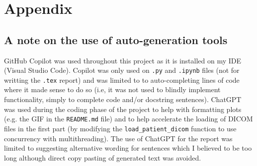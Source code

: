 \documentclass[12pt]{report}
\newcommand{\inlinecode}[1]{\lstinline[style=inline]{#1}}
\begin{document}
\printbibliography[heading=bibintoc, title={Bibliography}]

\chapter*{Appendix}
\section*{A note on the use of auto-generation tools}

GitHub Copilot was used throughout this project as it is installed on my IDE (Visual Studio Code). Copilot was only used on \inlinecode{.py} and \inlinecode{.ipynb} files (not for writting the \inlinecode{.tex} report) and was limited to to auto-completing lines of code where it made sense to do so (i.e, it was not used to blindly implement functionality, simply to complete code and/or docstring sentences). ChatGPT was used during the coding phase of the project to help with formatting plots (e.g. the GIF in the \inlinecode{README.md} file) and to help accelerate the loading of DICOM files in the first part (by modifying the \inlinecode{load_patient_dicom} function to use concurrency with multithreading). The use of ChatGPT for the report was limited to suggesting alternative wording for sentences which I believed to be too long although direct copy pasting of generated text was avoided.
\end{document}

